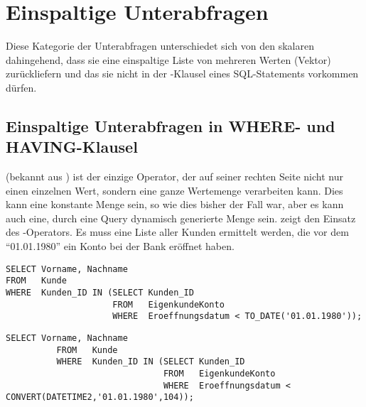     \section{Einspaltige Unterabfragen}
      Diese Kategorie der Unterabfragen unterschiedet sich von den skalaren dahingehend, dass sie eine einspaltige Liste von mehreren Werten (Vektor) zurückliefern und das sie nicht in der \SELECT-Klausel eines SQL-Statements vorkommen dürfen.
      \subsection{Einspaltige Unterabfragen in WHERE- und HAVING-Klausel}
         (bekannt aus ) ist der einzige Operator, der auf seiner rechten Seite nicht nur einen einzelnen Wert, sondern eine ganze Wertemenge verarbeiten kann. Dies kann eine konstante Menge sein, so wie dies bisher der Fall war, aber es kann auch eine, durch eine Query dynamisch generierte Menge sein.  zeigt den Einsatz des -Operators. Es muss eine Liste aller Kunden ermittelt werden, die vor dem \enquote{01.01.1980} ein Konto bei der Bank eröffnet haben.
        \begin{lstlisting}[language=oracle_sql,caption={\languageorasql{IN} mit Unterabfrage},label=sql06_07]
SELECT Vorname, Nachname
FROM   Kunde
WHERE  Kunden_ID IN (SELECT Kunden_ID
                     FROM   EigenkundeKonto
                     WHERE  Eroeffnungsdatum < TO_DATE('01.01.1980'));
        \end{lstlisting}

        \begin{lstlisting}[language=ms_sql,caption={Die Fehlermeldung in SQL Server},label=sql05_04]
          SELECT Vorname, Nachname
          FROM   Kunde
          WHERE  Kunden_ID IN (SELECT Kunden_ID
                               FROM   EigenkundeKonto
                               WHERE  Eroeffnungsdatum < CONVERT(DATETIME2,'01.01.1980',104));
                  \end{lstlisting}

